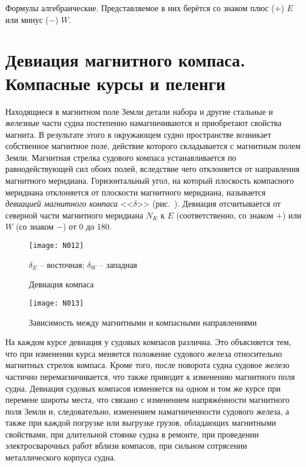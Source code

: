 Формулы алгебраические. Представляемое в них берётся со знаком плюс
($+$) $E$ или минус ($-$) $W$.

\section{Девиация магнитного компаса. Компасные курсы и пеленги} 

Находящиеся в магнитном поле Земли детали набора и другие стальные и
железные части судна постепенно намагничиваются и приобретают свойства
магнита. В результате этого в окружающем судно пространстве возникает
собственное магнитное поле, действие которого складывается с магнитным
полем Земли. Магнитная стрелка судового компаса устанавливается по
равнодействующей сил обоих полей, вследствие чего отклоняется от
направления магнитного меридиана. Горизонтальный угол, на который
плоскость компасного меридиана отклоняется от плоскости магнитного
меридиана, называется \textit{девиацией магнитного
  компаса} <<$\delta$>> (рис.~). Девиация
отсчитывается от северной части магнитного меридиана $N_K$ к $E$
(соответственно, со знаком $+$) или $W$ (со знаком $-$) от 0 до
180\gr.

\begin{figure}[htb]
  \centering{}
  \texttt{[image: N012]}
  \caption{Девиация компаса}
  \label{fig:N12}
  \small
  \centering{}
  $\delta_E$ \--- восточная; $\delta_W$ \--- западная
\end{figure}

\begin{figure*}[htb]
  \centering{}
  \texttt{[image: N013]}
  \caption{Зависимость между магнитными и компасными направлениями}
  \label{fig:N13}
\end{figure*}

На каждом курсе девиация у судовых компасов различна. Это объясняется
тем, что при изменении курса меняется положение судового железа
относительно магнитных стрелок компаса. Кроме того, после поворота
судна судовое железо частично перемагничивается, что также приводит к
изменению магнитного поля судна. Девиация судовых компасов изменяется
на одном и том же курсе при перемене широты места, что связано с
изменением напряжённости магнитного поля Земли и, следовательно,
изменением намагниченности судового железа, а также при каждой
погрузке или выгрузке грузов, обладающих магнитными свойствами, при
длительной стоянке судна в ремонте, при проведении электросварочных
работ вблизи компасов, при сильном сотрясении металлического корпуса
судна.

